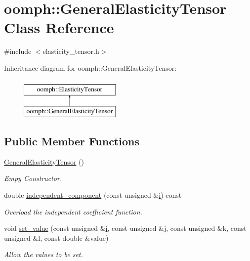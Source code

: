 \hypertarget{classoomph_1_1GeneralElasticityTensor}{}\section{oomph\+:\+:General\+Elasticity\+Tensor Class Reference}
\label{classoomph_1_1GeneralElasticityTensor}


{\ttfamily \#include $<$elasticity\+\_\+tensor.\+h$>$}

Inheritance diagram for oomph\+:\+:General\+Elasticity\+Tensor\+:\begin{figure}[H]
\begin{center}
\leavevmode
\includegraphics[height=2.000000cm]{classoomph_1_1GeneralElasticityTensor}
\end{center}
\end{figure}
\subsection*{Public Member Functions}
\begin{DoxyCompactItemize}
\item 
\hyperlink{classoomph_1_1GeneralElasticityTensor_a6b22a3888a575e622693268bc80ab504}{General\+Elasticity\+Tensor} ()
\begin{DoxyCompactList}\small\item\em Empy Constructor. \end{DoxyCompactList}\item 
double \hyperlink{classoomph_1_1GeneralElasticityTensor_a01443522709af3e2f1af63411be4f0e6}{independent\+\_\+component} (const unsigned \&\hyperlink{cfortran_8h_adb50e893b86b3e55e751a42eab3cba82}{i}) const
\begin{DoxyCompactList}\small\item\em Overload the independent coefficient function. \end{DoxyCompactList}\item 
void \hyperlink{classoomph_1_1GeneralElasticityTensor_aa8dee57c5a1315f790401628ece5ec26}{set\+\_\+value} (const unsigned \&\hyperlink{cfortran_8h_adb50e893b86b3e55e751a42eab3cba82}{i}, const unsigned \&j, const unsigned \&k, const unsigned \&l, const double \&value)
\begin{DoxyCompactList}\small\item\em Allow the values to be set. \end{DoxyCompactList}\end{DoxyCompactItemize}
